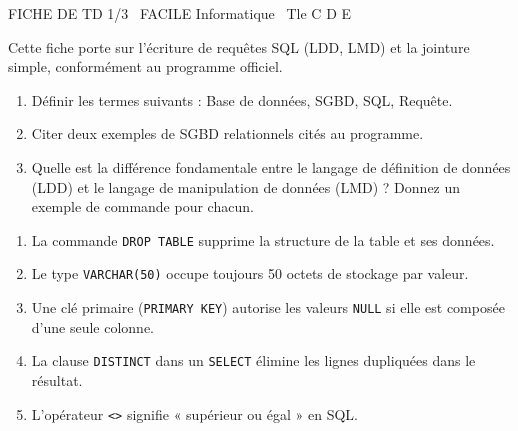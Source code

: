 \documentclass[11pt]{article}
\begin{document}
\begin{tcolorbox}[enhanced,colback=popink,colframe=popink,arc=10pt,boxrule=0pt,left=12pt,right=12pt,top=9pt,bottom=9pt]
{\color{white}\popxbold\small FICHE DE TD 1/3 \textbullet\ FACILE \hfill Informatique \textbullet\ Tle C D E\par}
\end{tcolorbox}
\vspace{4pt}
Cette fiche porte sur l'écriture de requêtes SQL (LDD, LMD) et la jointure simple, conformément au programme officiel.

\begin{exercice}
\begin{enumerate}
    \item Définir les termes suivants : Base de données, SGBD, SQL, Requête.
    \item Citer deux exemples de SGBD relationnels cités au programme.
    \item Quelle est la différence fondamentale entre le langage de définition de données (LDD) et le langage de manipulation de données (LMD) ? Donnez un exemple de commande pour chacun.
\end{enumerate}
\end{exercice}

\begin{exercice}
\begin{enumerate}
    \item La commande \texttt{DROP TABLE} supprime la structure de la table et ses données.
    \item Le type \texttt{VARCHAR(50)} occupe toujours 50 octets de stockage par valeur.
    \item Une clé primaire (\texttt{PRIMARY KEY}) autorise les valeurs \texttt{NULL} si elle est composée d'une seule colonne.
    \item La clause \texttt{DISTINCT} dans un \texttt{SELECT} élimine les lignes dupliquées dans le résultat.
    \item L'opérateur \texttt{<>} signifie « supérieur ou égal » en SQL.
\end{enumerate}
\end{exercice}
\end{document}
